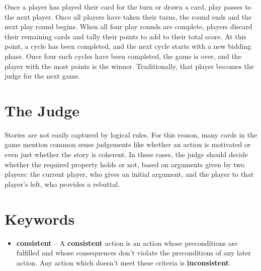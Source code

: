 \documentclass[12pt]{article}
\begin{document}
Once a player has played their card for the turn or drawn a card, play passes to the next player.
%
Once all players have taken their turns, the round ends and the next play round begins.
%
When all four play rounds are complete, players discard their remaining cards and tally their points to add to their total score.
%
At this point, a cycle has been completed, and the next cycle starts with a new bidding phase.
%
Once four such cycles have been completed, the game is over, and the player with the most points is the winner.
%
Traditionally, that player becomes the judge for the next game.

\section{The Judge}

Stories are not easily captured by logical rules.
%
For this reason, many cards in the game mention common sense judgements like whether an action is motivated or even just whether the story is coherent.
%
In these cases, the judge should decide whether the required property holds or not, based on arguments given by two players: the current player, who gives an initial argument, and the player to that player's left, who provides a rebuttal.

\section{Keywords}

\begin{itemize}
  \item \textbf{consistent} -- A \textbf{consistent} action is an action whose preconditions are fulfilled and whose consequences don't violate the preconditions of any later action. Any action which doesn't meet these criteria is \textbf{inconsistent}.
\end{itemize}
\end{document}

